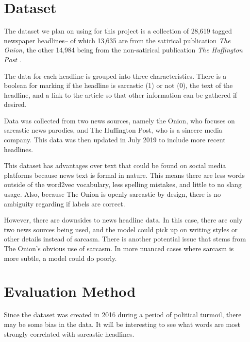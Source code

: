 \documentclass[11pt]{article}
\begin{document}
\section{Dataset}

The dataset we plan on using for this project is a collection of 28,619 tagged
newspaper headlines-- of which 13,635 are from the satirical publication
\textit{The Onion}, the other 14,984 being from the non-satirical publication
\textit{The Huffington Post} \cite{misra2023Sarcasm}.

The data for each headline is grouped into three characteristics. There is a
boolean for marking if the headline is sarcastic (1) or not (0), the text of
the headline, and a link to the article so that other information can be
gathered if desired.

Data was collected from two news sources, namely the Onion, who focuses on
sarcastic news parodies, and The Huffington Post, who is a sincere media
company. This data was then updated in July 2019 to include more recent
headlines.

This dataset has advantages over text that could be found on social media
platforms because news text is formal in nature. This means there are less
words outside of the word2vec vocabulary, less spelling mistakes, and little to
no slang usage. Also, because The Onion is openly sarcastic by design, there is
no ambiguity regarding if labels are correct.

However, there are downsides to news headline data. In this case, there are
only two news sources being used, and the model could pick up on writing styles
or other details instead of sarcasm. There is another potential issue that
stems from The Onion's obvious use of sarcasm. In more nuanced cases where
sarcasm is more subtle, a model could do poorly.

\section{Evaluation Method}

Since the dataset was created in 2016 during a period of political turmoil,
there may be some bias in the data. It will be interesting to see what words
are most strongly correlated with sarcastic headlines.
\end{document}
